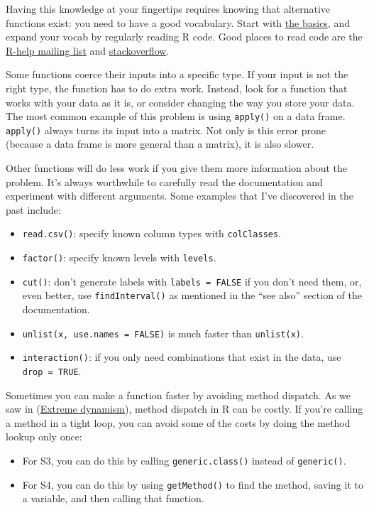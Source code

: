 Having this knowledge at your fingertips requires knowing that
alternative functions exist: you need to have a good vocabulary. Start
with \protect\hyperlink{vocabulary}{the basics}, and expand your vocab
by regularly reading R code. Good places to read code are the
\href{https://stat.ethz.ch/mailman/listinfo/r-help}{R-help mailing list}
and \href{http://stackoverflow.com/questions/tagged/r}{stackoverflow}.

Some functions coerce their inputs into a specific type. If your input
is not the right type, the function has to do extra work. Instead, look
for a function that works with your data as it is, or consider changing
the way you store your data. The most common example of this problem is
using \texttt{apply()} on a data frame. \texttt{apply()} always turns
its input into a matrix. Not only is this error prone (because a data
frame is more general than a matrix), it is also slower.

Other functions will do less work if you give them more information
about the problem. It's always worthwhile to carefully read the
documentation and experiment with different arguments. Some examples
that I've discovered in the past include:

\begin{itemize}
\item
  \texttt{read.csv()}: specify known column types with
  \texttt{colClasses}.
\item
  \texttt{factor()}: specify known levels with \texttt{levels}.
\item
  \texttt{cut()}: don't generate labels with \texttt{labels\ =\ FALSE}
  if you don't need them, or, even better, use \texttt{findInterval()}
  as mentioned in the ``see also'' section of the documentation.
\item
  \texttt{unlist(x,\ use.names\ =\ FALSE)} is much faster than
  \texttt{unlist(x)}.
\item
  \texttt{interaction()}: if you only need combinations that exist in
  the data, use \texttt{drop\ =\ TRUE}.
\end{itemize}

Sometimes you can make a function faster by avoiding method dispatch. As
we saw in (\protect\hyperlink{extreme-dynamism}{Extreme dynamism}),
method dispatch in R can be costly. If you're calling a method in a
tight loop, you can avoid some of the costs by doing the method lookup
only once: 

\begin{itemize}
\item
  For S3, you can do this by calling \texttt{generic.class()} instead of
  \texttt{generic()}.
\item
  For S4, you can do this by using \texttt{getMethod()} to find the
  method, saving it to a variable, and then calling that function.
\end{itemize}

